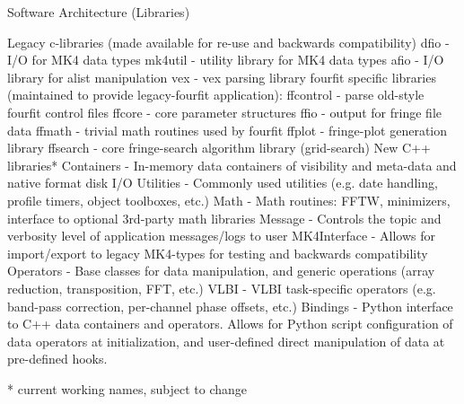 \documentclass[8pt]{beamer}
\begin{document}
\begin{frame}{Software Architecture (Libraries)}

\begin{outline}
  \1 Legacy c-libraries (made available for re-use and backwards compatibility)
    \2 dfio - I/O for MK4 data types
    \2 mk4util - utility library for MK4 data types
    \2 afio - I/O library for alist manipulation
    \2 vex - vex parsing library
    \2 fourfit specific libraries (maintained to provide legacy-fourfit application):
        \3 ffcontrol - parse old-style fourfit control files 
        \3 ffcore - core parameter structures
        \3 ffio - output for fringe file data
        \3 ffmath - trivial math routines used by fourfit
        \3 ffplot - fringe-plot generation library 
        \3 ffsearch - core fringe-search algorithm library (grid-search)
\1 New C++ libraries* 
    \2 Containers - In-memory data containers of visibility and meta-data and native format disk I/O
    \2 Utilities - Commonly used utilities (e.g. date handling, profile timers, object toolboxes, etc.)
    \2 Math - Math routines: FFTW, minimizers, interface to optional 3rd-party math libraries
    \2 Message - Controls the topic and verbosity level of application messages/logs to user
    \2 MK4Interface - Allows for import/export to legacy MK4-types for testing and backwards compatibility
    \2 Operators - Base classes for data manipulation, and generic operations (array reduction, transposition, FFT, etc.)
    \2 VLBI - VLBI task-specific operators (e.g. band-pass correction, per-channel phase offsets, etc.)
    \2 Bindings - Python interface to C++ data containers and operators. Allows for Python script configuration of data operators at initialization, and user-defined direct manipulation of data at pre-defined hooks.
\end{outline}

* current working names, subject to change
\end{frame}
\end{document}
